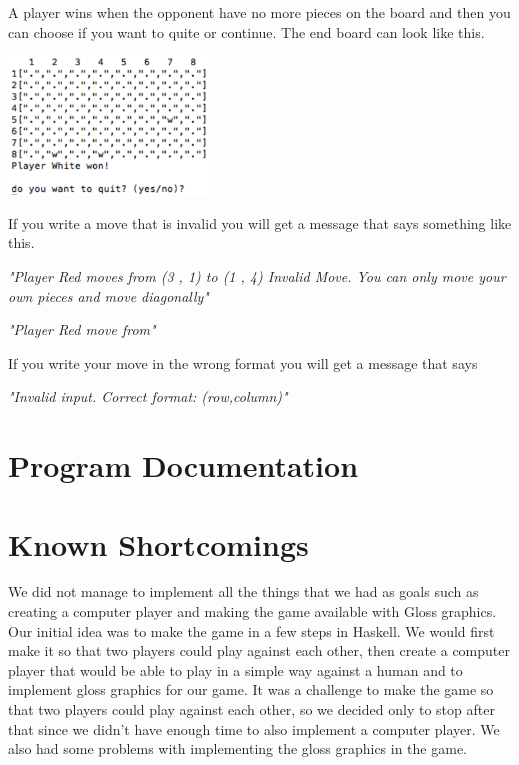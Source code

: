 \documentclass[12pt,a4paper]{article}
\begin{document}
A player wins when the opponent have no more pieces on the board and then you can choose if you want to quite or continue. The end board can look like this.

\begin{center}
	\includegraphics[width= 0.4\textwidth]{victory.PNG}
\end{center}

If you write a move that is invalid you will get a message that says something like this.

\textit{"Player Red moves from (3 , 1) to (1 , 4)
Invalid Move. You can only move your own pieces and move diagonally"}

\textit{"Player Red move from"}

If you write your move in the wrong format you will get a message that says 

\textit{"Invalid input. Correct format: (row,column)"}




\section{Program Documentation}

\section{Known Shortcomings}
We did not manage to implement all the things that we had as goals such as creating a computer player and making the game available with Gloss graphics.
Our initial idea was to make the game in a few steps in Haskell. We would first make it so that two players could play against each other, then create a computer player that would be able to play in a simple way against a human and to implement gloss graphics for our game. It was a challenge to make the game so that two players could play against each other, so we decided only to stop after that since we didn’t have enough time to also implement a computer player. We also had some problems with implementing the gloss graphics in the game.
\end{document}
